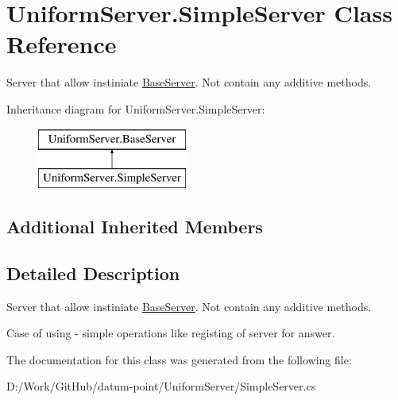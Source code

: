 \hypertarget{class_uniform_server_1_1_simple_server}{}\section{Uniform\+Server.\+Simple\+Server Class Reference}
\label{class_uniform_server_1_1_simple_server}


Server that allow instiniate \mbox{\hyperlink{class_uniform_server_1_1_base_server}{Base\+Server}}. Not contain any additive methods.  


Inheritance diagram for Uniform\+Server.\+Simple\+Server\+:\begin{figure}[H]
\begin{center}
\leavevmode
\includegraphics[height=2.000000cm]{dc/d09/class_uniform_server_1_1_simple_server}
\end{center}
\end{figure}
\subsection*{Additional Inherited Members}


\subsection{Detailed Description}
Server that allow instiniate \mbox{\hyperlink{class_uniform_server_1_1_base_server}{Base\+Server}}. Not contain any additive methods. 

Case of using -\/ simple operations like registing of server for answer. 

The documentation for this class was generated from the following file\+:\begin{DoxyCompactItemize}
\item 
D\+:/\+Work/\+Git\+Hub/datum-\/point/\+Uniform\+Server/Simple\+Server.\+cs\end{DoxyCompactItemize}
